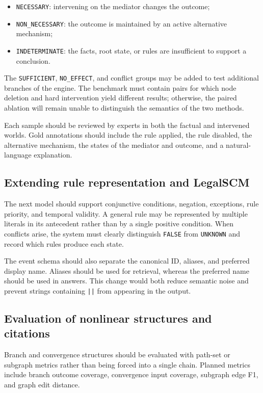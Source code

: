 \begin{itemize}
    \item \texttt{NECESSARY}: intervening on the mediator changes the outcome;
    \item \texttt{NON\_NECESSARY}: the outcome is maintained by an active
    alternative mechanism;
    \item \texttt{INDETERMINATE}: the facts, root state, or rules are
    insufficient to support a conclusion.
\end{itemize}

The \texttt{SUFFICIENT}, \texttt{NO\_EFFECT}, and conflict groups may be
added to test additional branches of the engine. The benchmark must contain
pairs for which node deletion and hard intervention yield different results;
otherwise, the paired ablation will remain unable to distinguish the
semantics of the two methods.

Each sample should be reviewed by experts in both the factual and intervened
worlds. Gold annotations should include the rule applied, the rule disabled,
the alternative mechanism, the states of the mediator and outcome, and a
natural-language explanation.

\subsection{Extending rule representation and LegalSCM}

The next model should support conjunctive conditions, negation, exceptions,
rule priority, and temporal validity. A general rule may be represented by
multiple literals in its antecedent rather than by a single positive
condition. When conflicts arise, the system must clearly distinguish
\texttt{FALSE} from \texttt{UNKNOWN} and record which rules produce each
state.

The event schema should also separate the canonical ID, aliases, and
preferred display name. Aliases should be used for retrieval, whereas the
preferred name should be used in answers. This change would both reduce
semantic noise and prevent strings containing \texttt{||} from appearing in
the output.

\subsection{Evaluation of nonlinear structures and citations}

Branch and convergence structures should be evaluated with path-set or
subgraph metrics rather than being forced into a single chain. Planned
metrics include branch outcome coverage, convergence input coverage,
subgraph edge F1, and graph edit distance.

